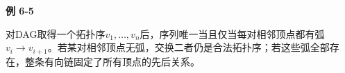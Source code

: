 {\color{ink}\bfseries 例 6-5}\par\vspace{1bp}对DAG取得一个拓扑序\(v_{1},\allowbreak{}\ldots ,\allowbreak{}v_{n}\)后，序列唯一当且仅当每对相邻顶点都有弧\(v_{i}\to v_{i+\allowbreak{}1}\)。若某对相邻顶点无弧，交换二者仍是合法拓扑序；若这些弧全部存在，整条有向链固定了所有顶点的先后关系。
